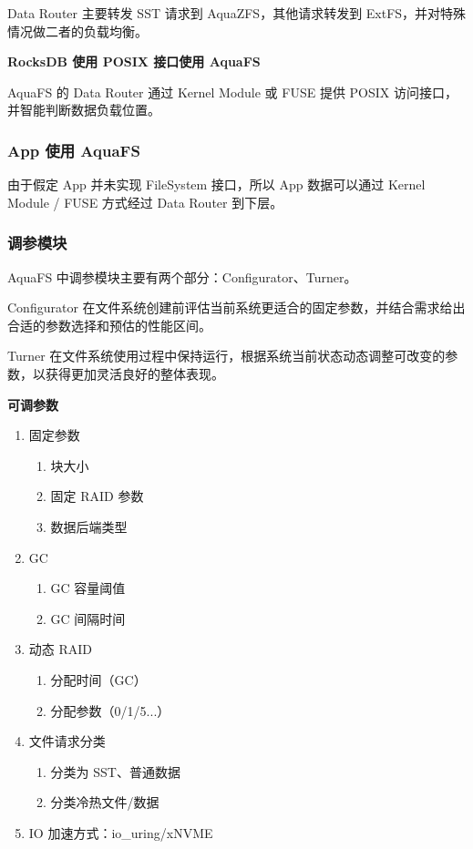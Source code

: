 Data Router 主要转发 SST 请求到 AquaZFS，其他请求转发到 ExtFS，并对特殊情况做二者的负载均衡。

\textbf{RocksDB 使用 POSIX 接口使用 AquaFS}

AquaFS 的 Data Router 通过 Kernel Module 或 FUSE 提供 POSIX 访问接口，并智能判断数据负载位置。

\subsubsection*{App 使用 AquaFS}

由于假定 App 并未实现 FileSystem 接口，所以 App 数据可以通过 Kernel Module / FUSE 方式经过 Data Router 到下层。

\subsubsection*{调参模块}

AquaFS 中调参模块主要有两个部分：Configurator、Turner。

Configurator 在文件系统创建前评估当前系统更适合的固定参数，并结合需求给出合适的参数选择和预估的性能区间。

Turner 在文件系统使用过程中保持运行，根据系统当前状态动态调整可改变的参数，以获得更加灵活良好的整体表现。

\textbf{可调参数}

\begin{enumerate}
    \item 固定参数
    \begin{enumerate}
        \item 块大小
        \item 固定 RAID 参数
        \item 数据后端类型
    \end{enumerate}
    \item GC
    \begin{enumerate}
        \item GC 容量阈值
        \item GC 间隔时间
    \end{enumerate}
    \item 动态 RAID
    \begin{enumerate}
        \item 分配时间（GC）
        \item 分配参数（0/1/5...）
    \end{enumerate}
    \item 文件请求分类
    \begin{enumerate}
        \item 分类为 SST、普通数据
        \item 分类冷热文件/数据
    \end{enumerate}
    \item IO 加速方式：io\_uring/xNVME
\end{enumerate}

